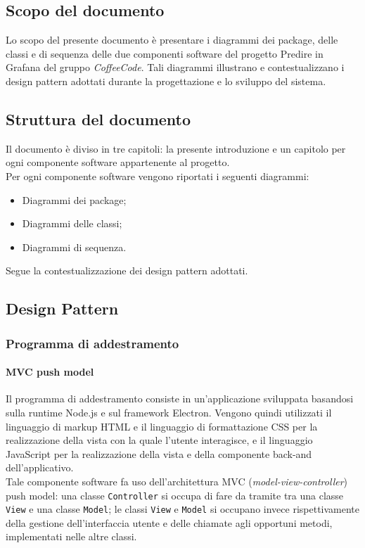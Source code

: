 \documentclass[../specifica-tecnica.tex]{subfiles}
\begin{document}
\subsection{Scopo del documento}
Lo scopo del presente documento è presentare i diagrammi dei package, delle classi e di sequenza delle due componenti software del progetto
 Predire in Grafana del gruppo \emph{CoffeeCode}. Tali diagrammi illustrano e contestualizzano i design pattern adottati durante la progettazione
 e lo sviluppo del sistema.

\subsection{Struttura del documento}
Il documento è diviso in tre capitoli: la presente introduzione e un capitolo per ogni componente software appartenente al progetto. \\
Per ogni componente software vengono riportati i seguenti diagrammi:
\begin{itemize}
  \item Diagrammi dei package;
  \item Diagrammi delle classi;
  \item Diagrammi di sequenza.
\end{itemize}
Segue la contestualizzazione dei design pattern adottati.

\subsection{Design Pattern}
\subsubsection{Programma di addestramento}
\paragraph{MVC push model}
Il programma di addestramento consiste in un'applicazione sviluppata basandosi sulla runtime Node.js e sul framework Electron. Vengono quindi utilizzati il 
linguaggio di markup HTML e il linguaggio di formattazione CSS per la realizzazione della vista con la quale l'utente interagisce, e il linguaggio JavaScript 
per la realizzazione della vista e della componente back-and dell'applicativo. \\
Tale componente software fa uso dell'architettura MVC (\textit{model-view-controller}) push model: una classe \texttt{Controller} si occupa di fare da tramite tra una classe \texttt{View} e 
una classe \texttt{Model}; le classi \texttt{View} e \texttt{Model} si occupano invece rispettivamente della gestione dell'interfaccia utente e delle chiamate agli opportuni metodi, implementati nelle 
altre classi.
\end{document}
